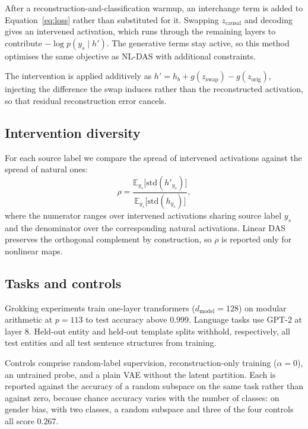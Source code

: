 \documentclass[11pt]{article}
\newcommand{\zc}{z_{\text{causal}}}
\begin{document}
After a reconstruction-and-classification warmup, an interchange term is added to
Equation~\ref{eq:loss} rather than substituted for it. Swapping $\zc$ and
decoding gives an intervened activation, which runs through the remaining layers
to contribute $-\log p(y_s \mid h')$. The generative terms stay active, so this
method optimises the same objective as NL-DAS with additional constraints.

The intervention is applied additively as
$h' = h_b + g(z_\text{swap}) - g(z_\text{orig})$, injecting the difference the
swap induces rather than the reconstructed activation, so that residual
reconstruction error cancels.

\subsection{Intervention diversity}

For each source label we compare the spread of intervened activations against the
spread of natural ones:
\begin{equation}
\rho = \frac{\mathbb{E}_{y_s}\bigl[\mathrm{std}(h'_{y_s})\bigr]}
            {\mathbb{E}_{y_s}\bigl[\mathrm{std}(h_{y_s})\bigr]},
\label{eq:rho}
\end{equation}
where the numerator ranges over intervened activations sharing source label $y_s$
and the denominator over the corresponding natural activations. Linear DAS
preserves the orthogonal complement by construction, so $\rho$ is reported only
for nonlinear maps.

\subsection{Tasks and controls}

Grokking experiments train one-layer transformers ($d_\text{model} = 128$) on
modular arithmetic at $p = 113$ to test accuracy above $0.999$. Language tasks use
GPT-2 at layer 8. Held-out entity and held-out template splits withhold,
respectively, all test entities and all test sentence structures from training.

Controls comprise random-label supervision, reconstruction-only training
($\alpha = 0$), an untrained probe, and a plain VAE without the latent partition.
Each is reported against the accuracy of a random subspace on the same task
rather than against zero, because chance accuracy varies with the number of
classes: on gender bias, with two classes, a random subspace and three of the
four controls all score $0.267$.
\end{document}
